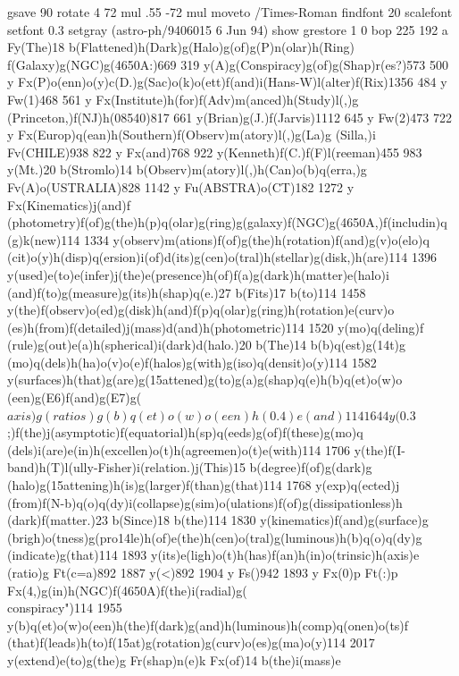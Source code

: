 gsave %
90 rotate 4 72 mul .55 -72 mul moveto /Times-Roman findfont
20 scalefont setfont 0.3 setgray (astro-ph/9406015   6 Jun 94) show grestore
1 0 bop 225 192 a Fy(The)18 b(Flattened)h(Dark)g(Halo)g(of)g(P)n(olar)h(Ring)
f(Galaxy)g(NGC)g(4650A:)669 319 y(A)g(Conspiracy)g(of)g(Shap)r(es?)573
500 y Fx(P)o(enn)o(y)c(D.)g(Sac)o(k)o(ett)f(and)i(Hans-W)l(alter)f(Rix)1356
484 y Fw(1)468 561 y Fx(Institute)h(for)f(Adv)m(anced)h(Study)l(,)g
(Princeton,)f(NJ)h(08540)817 661 y(Brian)g(J.)f(Jarvis)1112
645 y Fw(2)473 722 y Fx(Europ)q(ean)h(Southern)f(Observ)m(atory)l(,)g(La)g
(Silla,)i Fv(CHILE)938 822 y Fx(and)768 922 y(Kenneth)f(C.)f(F)l(reeman)455
983 y(Mt.)20 b(Stromlo)14 b(Observ)m(atory)l(,)h(Can)o(b)q(erra,)g
Fv(A)o(USTRALIA)828 1142 y Fu(ABSTRA)o(CT)182 1272 y Fx(Kinematics)j(and)f
(photometry)f(of)g(the)h(p)q(olar)g(ring)g(galaxy)f(NGC)g(4650A,)f(includin)q
(g)k(new)114 1334 y(observ)m(ations)f(of)g(the)h(rotation)f(and)g(v)o(elo)q
(cit)o(y)h(disp)q(ersion)i(of)d(its)g(cen)o(tral)h(stellar)g(disk,)h(are)114
1396 y(used)e(to)e(infer)j(the)e(presence)h(of)f(a)g(dark)h(matter)e(halo)i
(and)f(to)g(measure)g(its)h(shap)q(e.)27 b(Fits)17 b(to)114
1458 y(the)f(observ)o(ed)g(disk)h(and)f(p)q(olar)g(ring)h(rotation)e(curv)o
(es)h(from)f(detailed)j(mass)d(and)h(photometric)114 1520 y(mo)q(deling)f
(rule)g(out)e(a)h(spherical)i(dark)d(halo.)20 b(The)14 b(b)q(est)g(\014t)g
(mo)q(dels)h(ha)o(v)o(e)f(halos)g(with)g(iso)q(densit)o(y)114
1582 y(surfaces)h(that)g(are)g(\015attened)g(to)g(a)g(shap)q(e)h(b)q(et)o(w)o
(een)g(E6)f(and)g(E7)g(\(axis)g(ratios)g(b)q(et)o(w)o(een)h(0.4)e(and)114
1644 y(0.3\);)f(the)j(asymptotic)f(equatorial)h(sp)q(eeds)g(of)f(these)g(mo)q
(dels)i(are)e(in)h(excellen)o(t)h(agreemen)o(t)e(with)114 1706
y(the)f(I-band)h(T)l(ully-Fisher)i(relation.)j(This)15 b(degree)f(of)g(dark)g
(halo)g(\015attening)h(is)g(larger)f(than)g(that)114 1768 y(exp)q(ected)j
(from)f(N-b)q(o)q(dy)i(collapse)g(sim)o(ulations)f(of)g(dissipationless)h
(dark)f(matter.)23 b(Since)18 b(the)114 1830 y(kinematics)f(and)g(surface)g
(brigh)o(tness)g(pro\014le)h(of)e(the)h(cen)o(tral)g(luminous)h(b)q(o)q(dy)g
(indicate)g(that)114 1893 y(its)e(ligh)o(t)h(has)f(an)h(in)o(trinsic)h(axis)e
(ratio)g Ft(c=a)892 1887 y(<)892 1904 y Fs()942 1893 y
Fx(0)p Ft(:)p Fx(4,)g(in)h(NGC)f(4650A)f(the)i(radial)g(\\conspiracy")114
1955 y(b)q(et)o(w)o(een)h(the)f(dark)g(and)h(luminous)h(comp)q(onen)o(ts)f
(that)f(leads)h(to)f(\015at)g(rotation)g(curv)o(es)g(ma)o(y)114
2017 y(extend)e(to)g(the)g Fr(shap)n(e)k Fx(of)14 b(the)i(mass)e

